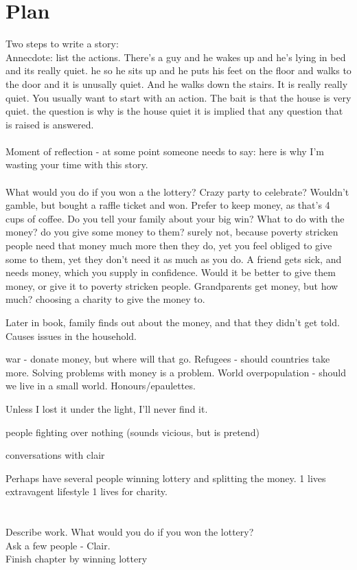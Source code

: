\documentclass[12pt, a4paper]{book}
\begin{document}
\chapter*{Plan}
Two steps to write a story:\\
Annecdote: list the actions. There's a guy and he wakes up and he's lying in bed and its really quiet. he so he sits up and he puts his feet on the floor and walks to the door and it is unusally quiet. And he walks down the stairs. It is really really quiet.
You usually want to start with an action.
The bait is that the house is very quiet. the question is why is the house quiet
it is implied that any question that is raised is answered.
\\\\
Moment of reflection - at some point someone needs to say: here is why I'm wasting your time with this story. 
\\\\
What would you do if you won a the lottery?
Crazy party to celebrate?
Wouldn't gamble, but bought a raffle ticket and won. Prefer to keep money, as that's 4 cups of coffee. Do you tell your family about your big win? What to do with the money? do you give some money to them? surely not, because poverty stricken people need that money much more then they do, yet you feel obliged to give some to them, yet they don't need it as much as you do.
A friend gets sick, and needs money, which you supply in confidence. Would it be better to give them money, or give it to poverty stricken people. 
Grandparents get money, but how much?
choosing a charity to give the money to.

Later in book, family finds out about the money, and that they didn't get told. Causes issues in the household. 

war - donate money, but where will that go. Refugees - should countries take more. Solving problems with money  is a problem. World overpopulation - should we live in a small world. Honours/epaulettes. 
 
Unless I lost it under the light, I'll never find it.

people fighting over nothing (sounds vicious, but is pretend)

conversations with clair

Perhaps have several people winning lottery and splitting the money.
1 lives extravagent lifestyle
1 lives for charity.

\chapter{}
Describe work. 
What would you do if you won the lottery?
\\Ask a few people - Clair.
\\Finish chapter by winning lottery
\end{document}

